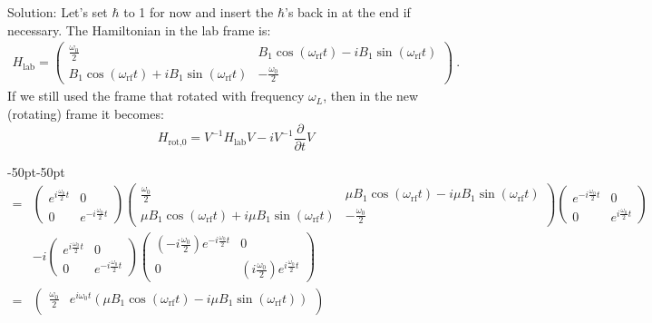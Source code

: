 \documentclass{../lab}
\begin{document}
\begin{enumerate}
\begin{enumerate}
		Solution: Let's set $\hbar$ to 1 for now and insert the $\hbar$'s back in at the end if necessary. The Hamiltonian in the lab frame is:
\begin{align*}
	H_\text{lab} = 
	\begin{pmatrix}
		\frac{\omega_\text{0}}{2} & B_1 \cos(\omega_\text{rf} t) - i B_1 \sin(\omega_\text{rf} t) \\
		 B_1 \cos(\omega_\text{rf} t) + i B_1 \sin(\omega_\text{rf} t)& -\frac{\omega_\text{0}}{2}
	\end{pmatrix}~. 
\end{align*}
If we still used the frame that rotated with frequency $\omega_L$, then in the new (rotating) frame it becomes:
$$H_\text{rot,0} = V^{-1} H_\text{lab} V - i V^{-1}\frac{\partial}{\partial t} V $$
	\begin{adjustwidth}{-50pt}{-50pt}
	\begin{align*}
	=& \begin{pmatrix}
		e^{i \frac{\omega_\text{0}}{2}t} & 0 \\
		0 & e^{-i \frac{\omega_\text{0}}{2}t}
	\end{pmatrix}
	\begin{pmatrix}
		\frac{\omega_\text{0}}{2} & \mu B_1 \cos(\omega_\text{rf} t) - i \mu B_1 \sin(\omega_\text{rf} t) \\
		 \mu B_1 \cos(\omega_\text{rf} t) + i \mu B_1 \sin(\omega_\text{rf} t)& - \frac{\omega_\text{0}}{2}
	\end{pmatrix}
	\begin{pmatrix}
		e^{-i \frac{\omega_\text{0}}{2}t} & 0 \\
		0 & e^{i \frac{\omega_\text{0}}{2}t}
	\end{pmatrix} \\
	&- i 
	\begin{pmatrix}
		e^{i \frac{\omega_\text{0}}{2}t} & 0 \\
		0 & e^{-i \frac{\omega_\text{0}}{2}t}
	\end{pmatrix}
	\begin{pmatrix}
		(-i \frac{\omega_\text{0}}{2}) e^{-i \frac{\omega_\text{0}}{2}t} & 0 \\
		0 &(i \frac{\omega_\text{0}}{2}) e^{i \frac{\omega_\text{0}}{2}t}
	\end{pmatrix} \\
	=& 
	\begin{pmatrix}
		\frac{\omega_\text{0}}{2} & e^{i \omega_\text{0}t} \left(\mu B_1 \cos(\omega_\text{rf} t) - i\mu B_1 \sin(\omega_\text{rf} t) \right) \\

\end{pmatrix}
\end{align*}
\end{adjustwidth}
\end{enumerate}
\end{enumerate}
\end{document}
